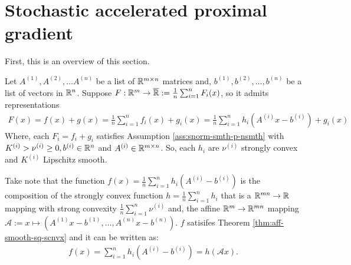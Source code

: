 \documentclass[12pt]{article}
\begin{document}
\section{Stochastic accelerated proximal gradient}
    First, this is an overview of this section. 

    \begin{assumption}\label{ass:sum-of-many-aff-comp}
        Let $A^{(1)}, A^{(2)}, \ldots A^{(n)}$ be a list of $\mathbb R^{m\times n}$ matrices and, $b^{(1)}, b^{(2)}, \ldots, b^{(n)}$ be a list of vectors in $\mathbb R^n$. 
        Suppose $F:\mathbb R^m \rightarrow \overline {\mathbb R}:= \frac{1}{n}\sum_{i = 1}^{n} F_i(x)$, so it admits representations 
        \begin{align*}
            F(x) = f(x) + g(x) = \frac{1}{n}\sum_{i = 1}^{n} f_i(x) + g_i(x) = \frac{1}{n}\sum_{i = 1}^{n} h_i(A^{(i)}x - b^{(i)}) + g_i(x)
        \end{align*}
        Where, each $F_i = f_i + g_i$ satisfies Assumption \ref{ass:snorm-smth-p-nsmth} with $K^{(i)} > \nu^{(i)} \ge 0, b^{(i)} \in \mathbb R^n$ and $A^{(i)} \in \mathbb R^{m \times n}$. 
        So, each $h_i$ are $\nu^{(i)}$ strongly convex and $K^{(i)}$ Lipschitz smooth. 
        \par
        Take note that the function $f(x) = \frac{1}{n}\sum_{i = 1}^{n} h_i(A^{(i)} - b^{(i)})$ is the composition of the strongly convex function $h = \frac{1}{n}\sum_{i = 1}^{n} h_i$ that is a $\mathbb R^{mn}\rightarrow \mathbb R$ mapping with strong convexity $\frac{1}{n}\sum_{i = 1}^{n} \nu^{(i)}$ and, the affine $\mathbb R^m \rightarrow \mathbb R^{mn}$ mapping $\mathcal A := x \mapsto (A^{(1)}x - b^{(1)},\ldots,  A^{(n)}x - b^{(n)})$. 
        $f$ satisifes Theorem \ref{thm:aff-smooth-sq-scnvx} and it can be written as: 
        \begin{align*}
            f(x) = \sum_{i = 1}^{n} h_i(A^{(i)} - b^{(i)}) = h(\mathcal A x). 
        \end{align*}
    \end{assumption}
\end{document}
